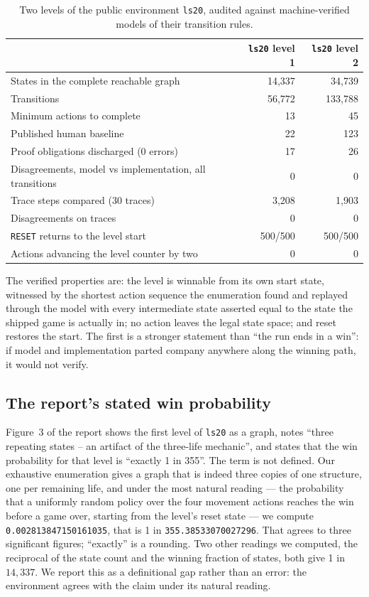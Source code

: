 \documentclass[11pt]{article}
\newcommand{\code}[1]{\texttt{#1}}
\begin{document}
\begin{table}[t]
\centering
\begin{tabular}{lrr}
\toprule
& \code{ls20} level 1 & \code{ls20} level 2 \\
\midrule
States in the complete reachable graph & 14{,}337 & 34{,}739 \\
Transitions & 56{,}772 & 133{,}788 \\
Minimum actions to complete & 13 & 45 \\
Published human baseline & 22 & 123 \\
Proof obligations discharged (0 errors) & 17 & 26 \\
Disagreements, model vs implementation, all transitions & 0 & 0 \\
Trace steps compared (30 traces) & 3{,}208 & 1{,}903 \\
Disagreements on traces & 0 & 0 \\
\code{RESET} returns to the level start & 500/500 & 500/500 \\
Actions advancing the level counter by two & 0 & 0 \\
\bottomrule
\end{tabular}
\caption{Two levels of the public environment \code{ls20}, audited against
machine-verified models of their transition rules.}
\label{tab:ls20}
\end{table}

The verified properties are: the level is winnable from its own start state,
witnessed by the shortest action sequence the enumeration found and replayed
through the model with every intermediate state asserted equal to the state the
shipped game is actually in; no action leaves the legal state space; and reset
restores the start. The first is a stronger statement than ``the run ends in a
win'': if model and implementation parted company anywhere along the winning
path, it would not verify.

\subsection{The report's stated win probability}

Figure~3 of the report shows the first level of \code{ls20} as a graph, notes
``three repeating states -- an artifact of the three-life mechanic'', and states
that the win probability for that level is ``exactly 1 in 355''. The term is not
defined. Our exhaustive enumeration gives a graph that is indeed three copies of
one structure, one per remaining life, and under the most natural reading
--- the probability that a uniformly random policy over the four movement
actions reaches the win before a game over, starting from the level's reset
state --- we compute \code{0.002813847150161035}, that is 1 in
\code{355.38533070027296}. That agrees to three significant figures; ``exactly''
is a rounding. Two other readings we computed, the reciprocal of the state count and the
winning fraction of states, both give 1 in $14{,}337$. We report this as a
definitional gap rather than an error: the environment agrees with the claim
under its natural reading.
\end{document}
